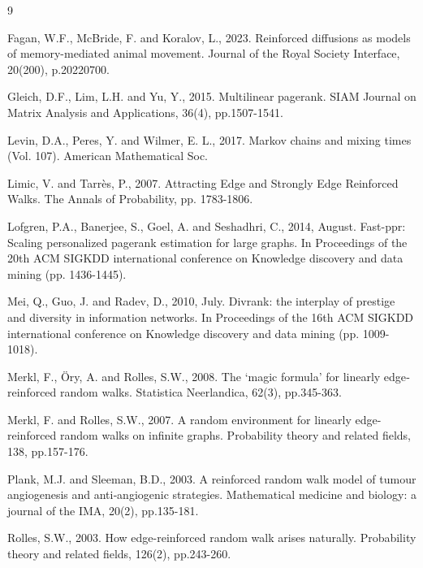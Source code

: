 \documentclass[a4paper, 11pt]{article}
\begin{document}
\begin{thebibliography}{9}

  Fagan, W.F., McBride, F. and Koralov, L., 2023. Reinforced diffusions as models of memory-mediated animal movement. Journal of the Royal Society Interface, 20(200), p.20220700.

  Gleich, D.F., Lim, L.H. and Yu, Y., 2015. Multilinear pagerank. SIAM Journal on Matrix Analysis and Applications, 36(4), pp.1507-1541.

  Levin, D.A., Peres, Y. and Wilmer, E. L., 2017. Markov chains and mixing times (Vol. 107). American Mathematical Soc.

  Limic, V. and Tarrès, P., 2007. Attracting Edge and Strongly Edge Reinforced Walks. The Annals of Probability, pp. 1783-1806.

  Lofgren, P.A., Banerjee, S., Goel, A. and Seshadhri, C., 2014, August. Fast-ppr: Scaling personalized pagerank estimation for large graphs. In Proceedings of the 20th ACM SIGKDD international conference on Knowledge discovery and data mining (pp. 1436-1445).

  Mei, Q., Guo, J. and Radev, D., 2010, July. Divrank: the interplay of prestige and diversity in information networks. In Proceedings of the 16th ACM SIGKDD international conference on Knowledge discovery and data mining (pp. 1009-1018).

  Merkl, F., Öry, A. and Rolles, S.W., 2008. The `magic formula' for linearly edge‐reinforced random walks. Statistica Neerlandica, 62(3), pp.345-363.


 Merkl, F. and Rolles, S.W., 2007. A random environment for linearly edge-reinforced random walks on infinite graphs. Probability theory and related fields, 138, pp.157-176.

  Plank, M.J. and Sleeman, B.D., 2003. A reinforced random walk model of tumour angiogenesis and anti‐angiogenic strategies. Mathematical medicine and biology: a journal of the IMA, 20(2), pp.135-181.

  Rolles, S.W., 2003. How edge-reinforced random walk arises naturally. Probability theory and related fields, 126(2), pp.243-260.


\end{thebibliography}
\end{document}
